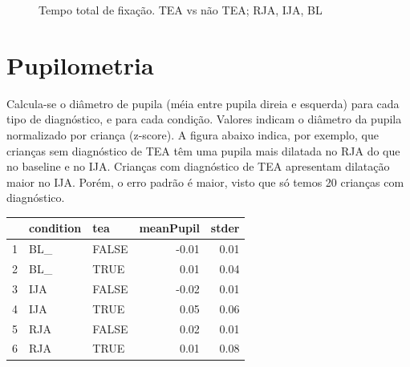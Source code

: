 \documentclass{article}
\begin{document}
\begin{figure}[]
\caption{Tempo total de fixação. TEA vs não TEA; RJA, IJA, BL}
\noindent{}
\centering
\end{figure}

\section{Pupilometria}

Calcula-se o diâmetro de pupila (méia entre pupila direia e esquerda) para cada tipo de diagnóstico, e para cada condição.
Valores indicam o diâmetro da pupila normalizado por criança (z-score). A figura abaixo indica, por exemplo, que crianças sem diagnóstico de TEA têm uma pupila mais dilatada no RJA do que no baseline e no IJA. Crianças com diagnóstico de TEA apresentam dilatação maior no IJA. Porém, o erro padrão é maior, visto que só temos 20 crianças com diagnóstico.

\begin{table}[ht]
\centering
\begin{tabular}{rllrr}
  \hline
 & condition & tea & meanPupil & stder \\
  \hline
  1 & BL\_ & FALSE & -0.01 & 0.01 \\
  2 & BL\_ & TRUE & 0.01 & 0.04 \\
  3 & IJA & FALSE & -0.02 & 0.01 \\
  4 & IJA & TRUE & 0.05 & 0.06 \\
  5 & RJA & FALSE & 0.02 & 0.01 \\
  6 & RJA & TRUE & 0.01 & 0.08 \\
   \hline
\end{tabular}
\end{table}
\end{document}

